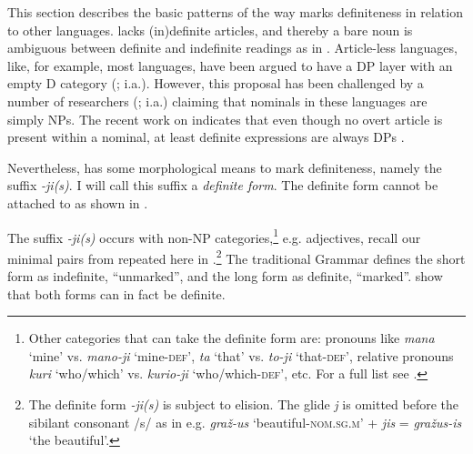 \documentclass[output=paper,
modfonts
]{langscibook}
\begin{document}
This section describes the basic patterns of the way  marks definiteness in relation to other languages. 
 lacks (in)definite articles, and thereby a bare noun is ambiguous between definite and indefinite readings as in . Article-less languages, like, for example, most  languages, have been argued to have a DP layer with an empty D category (\citealt{Rappaport1998,Leko1999,Pereltsvaig2007}; i.a.). However, this proposal has been challenged by a number of researchers (\citealt{Boskovic2009,Boskovic2012,BoskovicGajewski2011,Despic2011}; i.a.) claiming that nominals in these languages are simply NPs. The recent work on  indicates that even though no overt article is present within a nominal, at least definite expressions are always DPs \citep{GillonArmoskaite2015}.

\begin{exe}
\end{exe}

Nevertheless,  has some morphological means to mark definiteness, namely the suffix \textit{-ji(s)}. I will call this suffix a \textit{definite form}. The definite form cannot be attached to  as shown in . 

\begin{exe}
\end{exe}

The suffix \textit{-ji(s)} occurs with non-NP categories,\footnote{Other categories that can take the definite form are: pronouns like \textit{mana} `mine' vs. \textit{mano-ji} `mine-\textsc{def}', 
 \textit{ta}  `that' vs. \textit{to-ji} `that-\textsc{def}', relative pronouns \textit{kuri} `who/which' vs. \textit{kurio-ji} `who/which-\textsc{def}', etc. For a full list see \citet[223--224]{Stolz2008}.} e.g. adjectives, recall our minimal pairs from  repeated here in .\footnote{The definite form \textit{-ji(s)} is subject to elision. The glide \textit{j} is omitted before the sibilant consonant  /s/ as in e.g. \textit{graž-us} `beautiful-\textsc{nom.sg.m}' + \textit{jis} = \textit{gražus-is} `the beautiful'.} The traditional  Grammar \citep[142]{Ambrazas1997} defines the short form as indefinite, ``unmarked'', and the long form as definite, ``marked''. \citet{GillonArmoskaite2015} show that both forms can in fact be definite.
\end{document}
